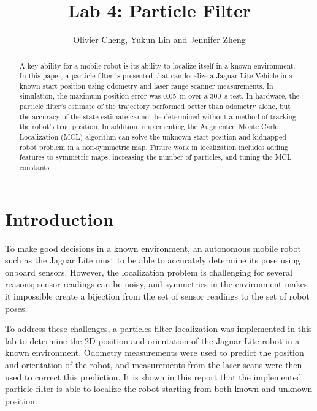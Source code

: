 \documentclass[conference]{../IEEEtran}
\begin{document}
\title{Lab 4: Particle Filter}
\author{Olivier Cheng, Yukun Lin and Jennifer Zheng}
\maketitle

\begin{abstract}
A key ability for a mobile robot is its ability to localize itself in a known environment.
In this paper, a particle filter is presented that can localize a Jaguar Lite Vehicle in a known start position using odometry and laser range scanner measurements.
In simulation, the maximum position error was \SI{0.05}{\meter} over a \SI{300}{\second} test.
In hardware, the particle filter's estimate of the trajectory performed better than odometry alone, but the accuracy of the state estimate cannot be determined without a method of tracking the robot's true position.
In addition, implementing the Augmented Monte Carlo Localization (MCL) algorithm can solve the unknown start position and kidnapped robot problem in a non-symmetric map.
Future work in localization includes adding features to symmetric maps, increasing the number of particles, and tuning the MCL constants.

\end{abstract}


\section{Introduction}
To make good decisions in a known environment, an autonomous mobile robot such as the
Jaguar Lite must to be able to accurately determine its pose using onboard sensors.
However, the localization problem is challenging for several reasons; sensor readings can
be noisy, and symmetries in the environment makes it impossible create a bijection from
the set of sensor readings to the set of robot poses.

To address these challenges, a particles filter localization was implemented in this lab
to determine the 2D position and orientation of the Jaguar Lite robot in a known
environment. Odometry measurements were used to predict the position and orientation of
the robot, and measurements from the laser scans were then used to correct this
prediction. It is shown in this report that the implemented particle filter is able to
localize the robot starting from both known and unknown position.
\end{document}
